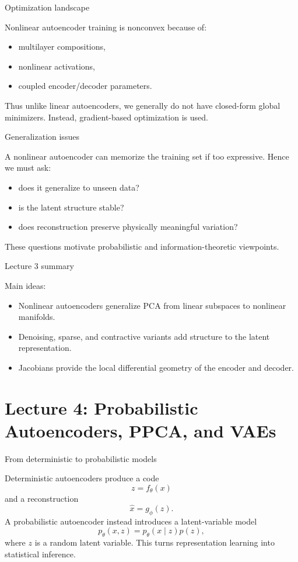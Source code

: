 \documentclass[aspectratio=169]{beamer}
\begin{document}
\begin{frame}{Optimization landscape}

Nonlinear autoencoder training is nonconvex because of:
\begin{itemize}
\item multilayer compositions,
\item nonlinear activations,
\item coupled encoder/decoder parameters.
\end{itemize}
Thus unlike linear autoencoders, we generally do not have closed-form global minimizers.
Instead, gradient-based optimization is used.

\end{frame}

\begin{frame}{Generalization issues}

A nonlinear autoencoder can memorize the training set if too expressive.
Hence we must ask:
\begin{itemize}
\item does it generalize to unseen data?
\item is the latent structure stable?
\item does reconstruction preserve physically meaningful variation?
\end{itemize}
These questions motivate probabilistic and information-theoretic viewpoints.

\end{frame}

\begin{frame}{Lecture 3 summary}

Main ideas:
\begin{itemize}
\item Nonlinear autoencoders generalize PCA from linear subspaces to nonlinear manifolds.
\item Denoising, sparse, and contractive variants add structure to the latent representation.
\item Jacobians provide the local differential geometry of the encoder and decoder.
\end{itemize}

\end{frame}

\section{Lecture 4: Probabilistic Autoencoders, PPCA, and VAEs}

\begin{frame}{From deterministic to probabilistic models}

Deterministic autoencoders produce a code
\[
z=f_\theta(x)
\]
and a reconstruction
\[
\hat x=g_\phi(z).
\]
A probabilistic autoencoder instead introduces a latent-variable model
\[
p_\theta(x,z)=p_\theta(x\mid z)p(z),
\]
where \(z\) is a random latent variable.
This turns representation learning into statistical inference.

\end{frame}
\end{document}
